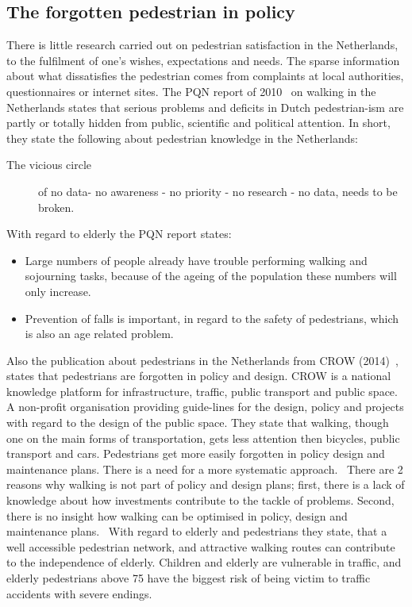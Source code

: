 \subsection{The forgotten pedestrian in policy}
There is little research carried out on pedestrian satisfaction in the Netherlands, to the fulfilment of one's wishes, expectations and needs. The sparse information about what dissatisfies the pedestrian comes from complaints at local authorities, questionnaires or internet sites. The PQN report of 2010~\cite{Sauter2010} on walking in the Netherlands states that serious problems and deficits in Dutch pedestrian-ism are partly or totally hidden from public, scientific and political attention. In short, they state the following about pedestrian knowledge in the Netherlands: 
\flushleft
\begin{description}
\item[The vicious circle] of no data- no awareness - no priority - no research - no data, needs to be broken.~\cite{Sauter2010}
\end{description} 

With regard to elderly the PQN report states:
\flushleft
\begin{itemize}
\item Large numbers of people already have trouble performing walking and sojourning tasks, because of the ageing of the population these numbers will only increase.~\cite{Sauter2010}
\item Prevention of falls is important, in regard to the safety of pedestrians, which is also an age related problem.~\cite{Sauter2010}
\end{itemize}



Also the publication about pedestrians in the Netherlands from CROW (2014)~\cite{Crow2014}, states that pedestrians are forgotten in policy and design. CROW is a national knowledge platform for infrastructure, traffic, public transport and public space. A non-profit organisation providing guide-lines for the design, policy and projects with regard to the design of the public space. 
They state that walking, though one on the main forms of transportation, gets less attention then bicycles, public transport and cars. Pedestrians get more easily forgotten in policy design and maintenance plans. There is a need for a more systematic approach.~\cite{Crow2014} There are 2 reasons why walking is not part of policy and design plans; first, there is a lack of knowledge about how investments contribute to the tackle of problems. Second, there is no insight how walking can be optimised in policy, design and maintenance plans.~\cite{Crow2014}
With regard to elderly and pedestrians they state, that a well accessible pedestrian network, and attractive walking routes can contribute to the independence of elderly. Children and elderly are vulnerable in traffic, and elderly pedestrians above 75 have the biggest risk of being victim to traffic accidents with severe endings.~\cite{Crow2014}

